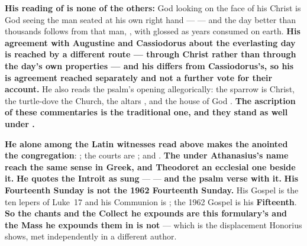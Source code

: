 \begin{witnessnote}
 \textbf{His reading of  is none
of the others:} God looking on the face of his Christ is
God seeing the man seated at his own right hand ---  --- and the day
better than thousands follows from that man, , with  glossed as years
consumed on earth. \textbf{His agreement with Augustine and Cassiodorus about
the everlasting day is reached by a different route --- through Christ rather
than through the day's own properties --- and his  differs from
Cassiodorus's, so his is agreement reached separately and not a further vote for
their account.} He also reads the psalm's
opening allegorically: the sparrow is Christ, the turtle-dove the Church, the
altars , and the house of God . \textbf{The ascription of these commentaries is
the traditional one, and they stand as well under .}
\end{witnessnote}

\begin{witnessnote}
 \textbf{He
alone among the Latin witnesses read above makes the anointed the congregation}:
; the courts are
; and . \textbf{The  under Athanasius's name reach the same
sense in Greek, and Theodoret an ecclesial one beside it.}
\textbf{He quotes the Introit as sung} --- 
--- \textbf{and the psalm verse with it.} \textbf{His Fourteenth Sunday is not
the 1962 Fourteenth Sunday.} His Gospel is the ten lepers of Luke~17 and his Communion is
; the 1962 Gospel is his \textbf{Fifteenth}.
\textbf{So the chants and the Collect he expounds are this formulary's and the
Mass he expounds them in is not} --- which is the displacement Honorius shows,
met independently in a different author.
\end{witnessnote}

